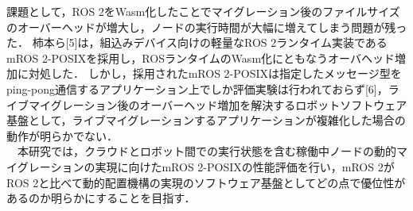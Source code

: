 \documentclass[11pt]{ujarticle}
\begin{document}
課題として，ROS 2をWasm化したことでマイグレーション後のファイルサイズのオーバーヘッドが増大し，ノードの実行時間が大幅に増えてしまう問題が残った．
柿本ら[5]は，組込みデバイス向けの軽量なROS 2ランタイム実装であるmROS 2-POSIXを採用し，ROSランタイムのWasm化にともなうオーバヘッド増加に対処した．
しかし，採用されたmROS 2-POSIXは指定したメッセージ型をping-pong通信するアプリケーション上でしか評価実験は行われておらず[6]，ライブマイグレーション後のオーバーヘッド増加を解決するロボットソフトウェア基盤として，ライブマイグレーションするアプリケーションが複雑化した場合の動作が明らかでない．
\\　本研究では，クラウドとロボット間での実行状態を含む稼働中ノードの動的マイグレーションの実現に向けたmROS 2-POSIXの性能評価を行い，mROS 2がROS 2と比べて動的配置機構の実現のソフトウェア基盤としてどの点で優位性があるのか明らかにすることを目指す．
\end{document}
